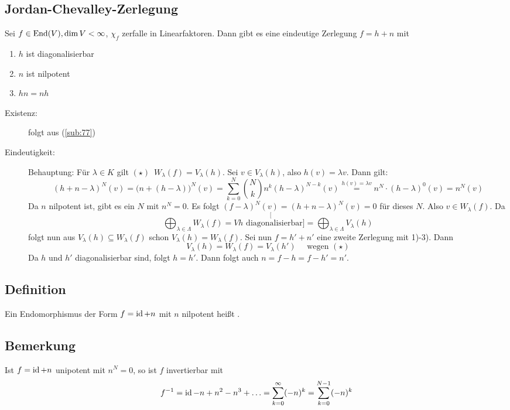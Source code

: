 \subsection{Jordan-Chevalley-Zerlegung} %
\label{sub:79}
Sei $f \in \operatorname{End}(V), \dim V < \infty$, $\chi_f$ zerfalle in Linearfaktoren. Dann gibt es eine eindeutige Zerlegung $f= h+n$ mit 
\begin{enumerate}[1)]
	\item $h$ ist diagonalisierbar
	\item $n$ ist nilpotent
	\item $h n= n h$
\end{enumerate}
\begin{description}
	\item[Existenz:] folgt aus (\ref{sub:77})
	\item[Eindeutigkeit:] Behauptung: Für $\lambda \in K$ gilt $(\star) \enspace W_\lambda (f) = V_\lambda (h)$. Sei $v \in V_\lambda (h)$, also $h(v)= \lambda v$.
	Dann gilt:
	\[
		(h+n-\lambda )^N (v) = \big(n+ (h-\lambda )\big)^N (v) = \sum_{k=0}^{N} \binom{N}{k} n^k (h-\lambda )^{N-k} (v) \stackrel{h(v)=\lambda v}{=} n^N \cdot (h-\lambda )^0 (v) = n^N (v)
	\]
	Da $n$ nilpotent ist, gibt es ein $N$ mit $n^N=0$. Es folgt $(f- \lambda )^N (v)= (h+n- \lambda )^N (v)= 0$ für dieses $N$. Also $v \in W_\lambda (f)$. Da 
	\[
		\bigoplus_{\lambda \in \Lambda} W_\lambda (f) = V \stackrel[{h \text{ diagonalisierbar}}]{}{=} \bigoplus_{\lambda  \in \Lambda}V_\lambda (h)  
	\]
	folgt nun aus $V_\lambda (h) \subseteq W_\lambda (f)$ schon $V_\lambda (h)= W_\lambda (f)$. Sei nun $f= h' + n'$ eine zweite Zerlegung mit 1)-3). Dann 
	\[
		V_\lambda (h) = W_\lambda (f) =V_\lambda (h') \quad \text{ wegen } (\star) 
	\]
	Da $h$ und $h'$ diagonalisierbar sind, folgt $h=h'$. Dann folgt auch $n=f-h=f-h'=n'$. \bewende
\end{description}

\subsection[Definition: unipotenter Endomorphismus]{Definition} %
\label{sub:710}
Ein Endomorphismus der Form $f= \operatorname{id} +n$ mit $n$ nilpotent heißt . 

\subsection[Bemerkung über unipotente Endomorphismen]{Bemerkung} %
\label{sub:711}
Ist $f= \operatorname{id} + n$ unipotent mit $n^N=0$, so ist $f$ invertierbar mit 
\[
	f ^{-1} = \operatorname{id} - n + n^2 - n^3 + \ldots = \sum_{k=0}^{\infty} (-n)^k = \sum_{k=0}^{N-1} (-n)^k 
\]

